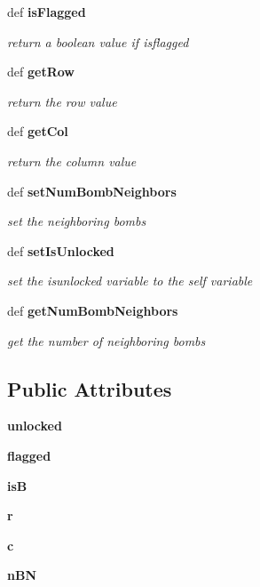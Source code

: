 \begin{CompactItemize}
def \bf{is\-Flagged}
\begin{CompactList}\small\item\em return a boolean value if isflagged \item\end{CompactList}\item 
def \bf{get\-Row}
\begin{CompactList}\small\item\em return the row value \item\end{CompactList}\item 
def \bf{get\-Col}
\begin{CompactList}\small\item\em return the column value \item\end{CompactList}\item 
def \bf{set\-Num\-Bomb\-Neighbors}
\begin{CompactList}\small\item\em set the neighboring bombs \item\end{CompactList}\item 
def \bf{set\-Is\-Unlocked}
\begin{CompactList}\small\item\em set the isunlocked variable to the self variable \item\end{CompactList}\item 
def \bf{get\-Num\-Bomb\-Neighbors}
\begin{CompactList}\small\item\em get the number of neighboring bombs \item\end{CompactList}\end{CompactItemize}
\subsection*{Public Attributes}
\begin{CompactItemize}
\item 
\textbf{unlocked}\label{classCell_1_1Cell_e3485a4a421992cacee96f3b16b42a94}

\item 
\textbf{flagged}\label{classCell_1_1Cell_de609245f890339fe8f074059579004f}

\item 
\textbf{is\-B}\label{classCell_1_1Cell_627c44252d650423cf263b5bd252ec64}

\item 
\textbf{r}\label{classCell_1_1Cell_7071b22f9ba230820b22e5590f92ad01}

\item 
\textbf{c}\label{classCell_1_1Cell_5a4ecd9c390caedfe9cab05961682e23}

\item 
\textbf{n\-BN}\label{classCell_1_1Cell_3b45c62f28d089230c5ec1a87728bbe5}

\end{CompactItemize}


